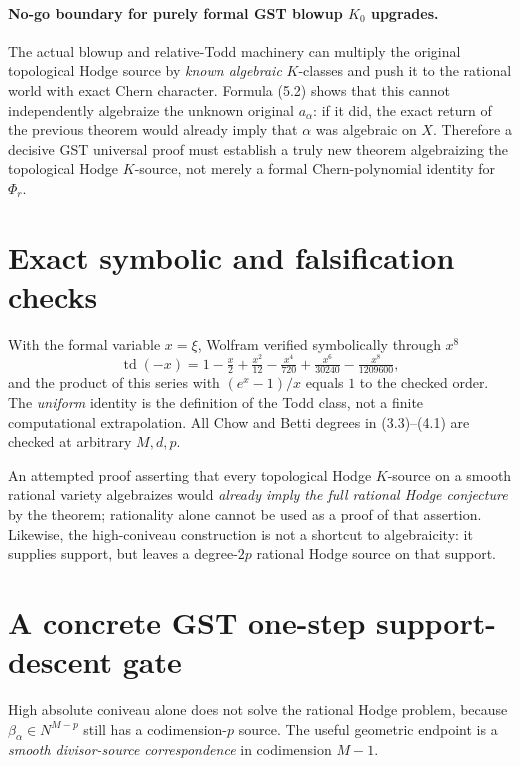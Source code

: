 \documentclass[11pt]{article}
\newcommand{\td}{\operatorname{td}}
\begin{document}
\paragraph{No-go boundary for purely formal GST blowup \(K_0\) upgrades.}
The actual blowup and relative-Todd machinery
can multiply the original topological Hodge
source by \emph{known algebraic} \(K\)-classes
and push it to the rational world with exact
Chern character. Formula (5.2) shows that
this cannot independently algebraize the
unknown original \(a_\alpha\): if it did,
the exact return of the previous theorem
would already imply that \(\alpha\) was
algebraic on \(X\). Therefore a decisive
GST universal proof must establish a truly
new theorem algebraizing the topological
Hodge \(K\)-source, not merely a formal
Chern-polynomial identity for \(\Phi_r\).

\section{Exact symbolic and falsification checks}
With the formal variable \(x=\xi\), Wolfram
verified symbolically through \(x^8\)
\[
 \td(-x)=1-\tfrac{x}{2}
     +\tfrac{x^2}{12}-\tfrac{x^4}{720}
     +\tfrac{x^6}{30240}
     -\tfrac{x^8}{1209600},
\]
and the product of this series with
\((e^x-1)/x\) equals \(1\)
to the checked order. The \emph{uniform}
identity is the definition of the Todd
class, not a finite computational
extrapolation. All Chow and Betti
degrees in (3.3)--(4.1) are checked
at arbitrary \(M,d,p\).

An attempted proof asserting that every
topological Hodge \(K\)-source on a
smooth rational variety algebraizes
would \emph{already imply the full
rational Hodge conjecture} by the theorem;
rationality alone cannot be used
as a proof of that assertion. Likewise,
the high-coniveau construction is not
a shortcut to algebraicity: it
supplies support, but leaves a
degree-\(2p\) rational Hodge source
on that support.

\section{A concrete GST one-step support-descent gate}
High absolute coniveau alone does not solve
the rational Hodge problem, because
\(\beta_\alpha\in N^{M-p}\) still
has a codimension-\(p\) source.
The useful geometric endpoint is
a \emph{smooth divisor-source correspondence}
in codimension \(M-1\).
\end{document}
